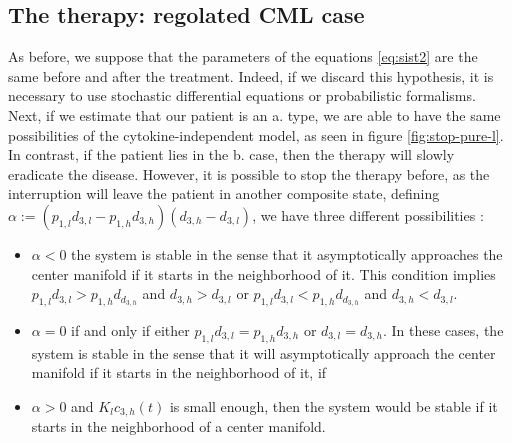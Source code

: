 \documentclass[a4paper,10pt]{article}
\begin{document}
\subsection{ The therapy: regolated CML case}
As before, we suppose that the parameters of the equations \eqref{eq:sist2} 
are the same before 
and after the treatment. 
Indeed,  if we  discard this hypothesis, it is necessary
to use stochastic differential equations or 
probabilistic
formalisms.\\
Next, if we estimate that our patient is an a. type, we are able to have the same possibilities 
of the cytokine-independent model, as seen in figure \ref{fig:stop-pure-l}.\\
In contrast, if the patient lies in the b. case, then the therapy will slowly eradicate the disease. 
However, it is possible to stop the therapy before, as the interruption will leave
the patient in another composite state, defining $\alpha:=(p_{1,l}d_{3,l}-p_{1,h}d_{3,h})(d_{3,h}-d_{3,l})$, we have three different possibilities 
\cite{stiehl2012mathematical}:
\begin{itemize}
\item $\alpha<0$ the system is stable in the sense that it asymptotically approaches the center manifold if it starts in
the neighborhood of it. This condition implies $p_{1,l}d_{3,l}>p_{1,h}d_{d_{3,h}} $
and $d_{3,h}>d_{3,l}$ or $p_{1,l}d_{3,l}<p_{1,h}d_{d_{3,h}} $
and $d_{3,h}<d_{3,l}$.
\item $\alpha=0$ if and only if either $p_{1,l}d_{3,l}=p_{1,h}d_{3,h}$ or $d_{3,l}=d_{3,h}$.
In these cases, the system is stable in the sense that it will asymptotically approach the center manifold
if it starts in the neighborhood of it,
if \item $\alpha>0$ and $K_{l}c_{3,h}(t)$ is small enough, then the system would be stable 
if it starts in the neighborhood of a center manifold.
\end{itemize}
\end{document}

